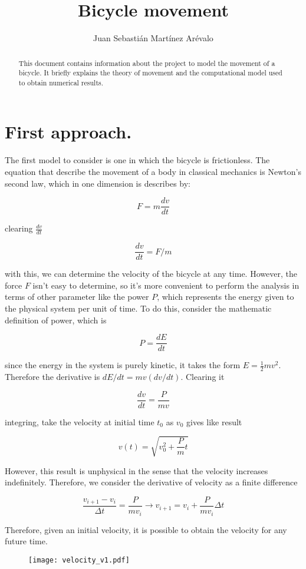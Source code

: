 \documentclass{article}
\title{Bicycle movement}
\author{Juan Sebasti\'{a}n Mart\'{i}nez Ar\'{e}valo}
\begin{document}
\maketitle

\begin{abstract}
This document contains information about the project to model the movement of a bicycle. It briefly explains the theory of movement and the computational model used to obtain numerical results.
\end{abstract}

\section{First approach.}

The first model to consider is one in which the bicycle is frictionless. The equation that describe the movement of a body in classical mechanics is Newton's second law, which in one dimension is describes by:

\begin{equation}
  F = m\frac{dv}{dt}
\end{equation}

clearing $\frac{dv}{dt}$

\begin{equation}
  \frac{dv}{dt} = F/m
  \label{NSL}
\end{equation}

with this, we can determine the velocity of the bicycle at any time. However,  the force $F$ isn't easy to determine, so it's more convenient to perform the analysis in terms of other parameter like the power $P$, which represents the energy given to the physical system per unit of time. To do this, consider the mathematic definition of power, which is

\begin{equation}
  P = \frac{dE}{dt}
\end{equation}

since the energy in the system is purely kinetic, it takes the form $E=\frac{1}{2}mv^{2}$. Therefore the derivative is $dE/dt = mv(dv/dt)$. Clearing it

\begin{equation}
  \frac{dv}{dt} = \frac{P}{mv}
\end{equation}

integring, take the velocity at initial time $t_0$ as $v_0$ gives like result

\begin{equation}
  v(t) = \sqrt{v_0^2 + \frac{P}{m}t}
\end{equation}

However, this result is unphysical in the sense that the velocity increases indefinitely. Therefore, we consider the derivative of velocity as a finite difference


$$ \frac{v_{i+1} - v_i}{\Delta t} = \frac{P}{mv_{i}} \rightarrow v_{i+1} = v_i + \frac{P}{mv_{i}}\Delta t$$

Therefore, given an initial velocity, it is possible to obtain the velocity for any future time.

\begin{figure}[!h]
  \centering
  \texttt{[image: velocity\_v1.pdf]}
\end{figure}
\end{document}
